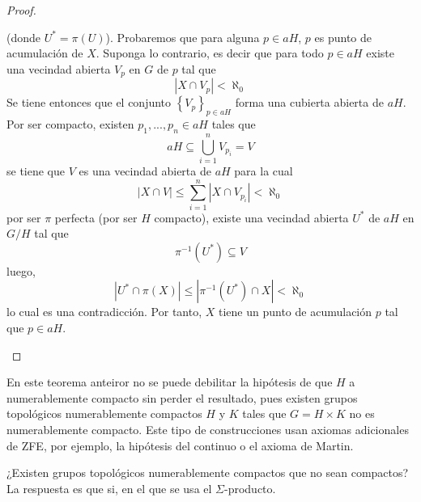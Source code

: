 \documentclass[12pt]{report}
\theoremstyle{largebreak}
\newcommand\abs[1]{\ensuremath{\left|#1\right|}}
\begin{document}
\begin{proof}
\begin{itemize}
            (donde $U^*=\pi(U)$). Probaremos que para alguna $p\in aH$, $p$ es punto de acumulación de $X$. Suponga lo contrario, es decir que para todo $p\in aH$ existe una vecindad abierta $V_p$ en $G$ de $p$ tal que
            \begin{equation*}
                \abs{X\cap V_p}<\aleph_0
            \end{equation*}
            Se tiene entonces que el conjunto $\left\{V_p \right\}_{ p\in aH}$ forma una cubierta abierta de $aH$. Por ser compacto, existen $p_1,...,p_n\in aH$ tales que
            \begin{equation*}
                aH\subseteq \bigcup_{ i=1}^n V_{ p_i}=V
            \end{equation*}
            se tiene que $V$ es una vecindad abierta de $aH$ para la cual
            \begin{equation*}
                \abs{X\cap V}\leq\sum_{ i=1}^n\abs{X\cap V_{ p_i}}<\aleph_0
            \end{equation*}
            por ser $\pi$ perfecta (por ser $H$ compacto), existe una vecindad abierta $U^*$ de $aH$ en $G/H$ tal que
            \begin{equation*}
                \pi^{-1}(U^*)\subseteq V
            \end{equation*}
            luego,
            \begin{equation*}
                \abs{U^*\cap \pi(X)}\leq \abs{\pi^{-1}(U^*)\cap X}<\aleph_0
            \end{equation*}
            lo cual es una contradicción. Por tanto, $X$ tiene un punto de acumulación $p$ tal que $p\in aH$.
        \end{itemize}
    \end{proof}

    En este teorema anteiror no se puede debilitar la hipótesis de que $H$ a numerablemente compacto sin perder el resultado, pues existen grupos topológicos numerablemente compactos $H$ y $K$ tales que $G=H\times K$ no es numerablemente compacto. Este tipo de construcciones usan axiomas adicionales de ZFE, por ejemplo, la hipótesis del continuo o el axioma de Martin.

    ¿Existen grupos topológicos numerablemente compactos que no sean compactos? La respuesta es que si, en el que se usa el $\Sigma$-producto.
\end{document}
